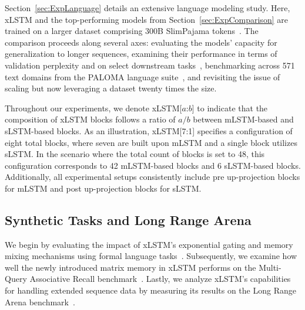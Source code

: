 Section~\ref{sec:ExpLanguage} details an extensive language modeling study. Here, xLSTM and the top-performing models from Section~\ref{sec:ExpComparison} are trained on a larger dataset comprising 300B SlimPajama tokens~\citep{Soboleva:23}. The comparison proceeds along several axes: evaluating the models' capacity for generalization to longer sequences, examining their performance in terms of validation perplexity and on select downstream tasks~\citep{Sutawika:24}, benchmarking across 571 text domains from the PALOMA language suite~\citep{Magnusson:23arxivshort}, and revisiting the issue of scaling but now leveraging a dataset twenty times the size.

\label{sec:xlstm_blocks_notation}
Throughout our experiments, we denote xLSTM[$a$:$b$] to indicate that the composition of xLSTM blocks follows a ratio of $a/b$ between mLSTM-based and sLSTM-based blocks. As an illustration, xLSTM[7:1] specifies a configuration of eight total blocks, where seven are built upon mLSTM and a single block utilizes sLSTM. In the scenario where the total count of blocks is set to 48, this configuration corresponds to 42 mLSTM-based blocks and 6 sLSTM-based blocks. Additionally, all experimental setups consistently include pre up-projection blocks for mLSTM and post up-projection blocks for sLSTM.

\subsection{Synthetic Tasks and Long Range Arena}
\label{sec:ExpSyntethic}
We begin by evaluating the impact of xLSTM's exponential gating and memory mixing mechanisms using formal language tasks~\citep{Deletang:23}. Subsequently, we examine how well the newly introduced matrix memory in xLSTM performs on the Multi-Query Associative Recall benchmark~\citep{Arora:23arxiv}. Lastly, we analyze xLSTM’s capabilities for handling extended sequence data by measuring its results on the Long Range Arena benchmark~\citep{Tay:21}.

